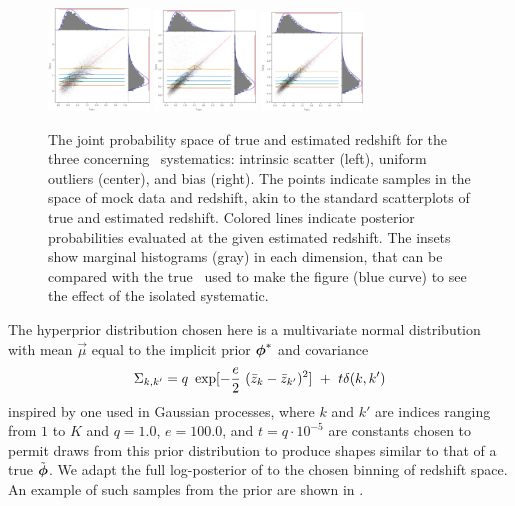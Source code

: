 \begin{figure}
	\begin{center}
		\includegraphics[width=0.24\textwidth]{figures/chippr/scatter_scatplot.png}
		\includegraphics[width=0.24\textwidth]{figures/chippr/outlier_scatplot.png}
		\includegraphics[width=0.24\textwidth]{figures/chippr/bias_scatplot.png}
		\caption{The joint probability space of true and estimated redshift for the three concerning \pz\ systematics: intrinsic scatter (left), uniform outliers (center), and bias (right).
			The points indicate samples in the space of mock data and redshift, akin to the standard scatterplots of true and estimated redshift.
			Colored lines indicate posterior probabilities evaluated at the given estimated redshift.
			The insets show marginal histograms (gray) in each dimension, that can be compared with the true \nz\ used to make the figure (blue curve) to see the effect of the isolated systematic.
		}
	\end{center}
\end{figure}

The hyperprior distribution chosen here is a multivariate normal distribution with mean $\vec{\mu}$ equal to the implicit prior ${\boldsymbol{\phi}}^{*}$ and covariance
\begin{equation}
\eqlabel{eqn:priorcov}
\Sigma_{k,k'} = q\ \exp[-\frac{e}{2}\ (\bar{z}_{k}-\bar{z}_{k'})^{2}]\ +\ t\delta(k,k')
\end{equation}
inspired by one used in Gaussian processes, where $k$ and $k'$ are indices ranging from $1$ to $K$ and $q=1.0$, $e=100.0$, and $t=q\cdot10^{-5}$ are constants chosen to permit draws from this prior distribution to produce shapes similar to that of a true $\tilde{{\boldsymbol{\phi}}}$.  
We adapt the full log-posterior of  to the chosen binning of redshift space.
An example of such samples from the prior are shown in .


